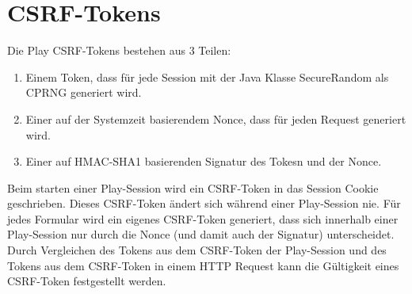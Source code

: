 \documentclass[12pt,DIV14,BCOR10mm,a4paper,parskip=half-,headsepline,headinclude,english,ngerman,bibliography=totocnumbered]{scrreprt}
\begin{document}
\section{CSRF-Tokens}
Die Play CSRF-Tokens bestehen aus 3 Teilen: 
\begin{enumerate}
\item Einem Token, dass für jede Session mit der Java Klasse SecureRandom als CPRNG generiert wird.
\item Einer auf der Systemzeit basierendem Nonce, dass für jeden Request generiert wird.
\item Einer auf HMAC-SHA1 basierenden Signatur des Tokesn und der Nonce.
\end{enumerate}

Beim starten einer Play-Session wird ein CSRF-Token in das Session Cookie geschrieben. Dieses CSRF-Token ändert sich während einer Play-Session nie. Für jedes Formular wird ein eigenes CSRF-Token generiert, dass sich innerhalb einer Play-Session nur durch die Nonce (und damit auch der Signatur) unterscheidet. Durch Vergleichen des Tokens aus dem CSRF-Token der Play-Session und des Tokens aus dem CSRF-Token in einem HTTP Request kann die Gültigkeit eines CSRF-Token festgestellt werden. 
\end{document}

